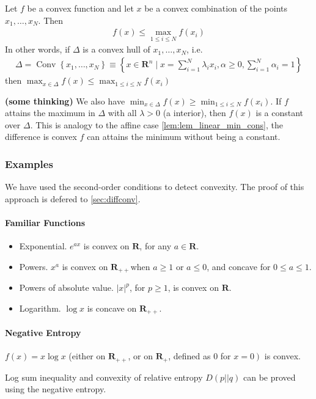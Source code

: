 \documentclass{article}
\newcommand{\bfs}[1]{\textbf{({#1}) }}
\begin{document}
\begin{cora}\label{co:b_f_ex}
Let $f$ be a convex function and let $x$ be a convex combination of the points $x_{1}, \ldots, x_{N} .$ Then
\begin{align*}
f(x) \leq \max _{1 \leq i \leq N} f\left(x_{i}\right)
\end{align*}
In other words, if $\Delta$ is a convex hull of $x_{1}, \ldots, x_{N}$, i.e.
\begin{align*}
\Delta=\operatorname{Conv}\left\{x_{1}, \ldots, x_{N}\right\} \equiv\left\{x \in \mathbf{R}^{n} \mid x=\sum_{i=1}^{N} \lambda_{i} x_{i}, \alpha \geq 0, \sum_{i=1}^{N} \alpha_{i}=1\right\}
\end{align*}
then $\max _{x \in \Delta} f(x) \leq \max _{1 \leq i \leq N} f\left(x_{i}\right)$
\end{cora}
\begin{rema}{\bfs{some thinking}}\label{rem:max_conffff}
We also have $\min _{x \in \Delta} f(x) \ge \min _{1 \leq i \leq N} f\left(x_{i}\right)$. If $f$ attains the maximum in $ \Delta$ with all $\lambda>0$ (a interior), then $f(x)$ is a constant over $\Delta$. This is analogy to the affine case  \cref{lem:lem_linear_min_cons}, the difference is convex $f$ can attains the minimum without being a constant.
\end{rema}

\subsubsection{Examples}\label{sec:conxff}
We have used the second-order conditions to detect convexity. The proof of this approach is defered to \cref{sec:diffconv}.
\paragraph{Familiar Functions}
\begin{itemize}
    \item Exponential. $e^{a x}$ is convex on $\mathbf{R}$, for any $a \in \mathbf{R}$.
    \item  Powers. $x^{a}$ is convex on $\mathbf{R}_{++}$when $a \geq 1$ or $a \leq 0$, and concave for $0 \leq a \leq 1$.
    \item Powers of absolute value. $|x|^{p}$, for $p \geq 1$, is convex on $\mathbf{R}$.
    \item Logarithm. $\log x$ is concave on $\mathbf{R}_{++}$.
\end{itemize}
\paragraph{Negative Entropy}
$f(x)=x \log x$ (either on $\mathbf{R}_{++}$, or on $\mathbf{R}_{+}$, defined as 0 for $\left.x=0\right)$ is convex.
\begin{rema}
Log sum inequality and convexity of relative entropy $D(p || q)$ can be proved using the negative entropy.
\end{rema}
\end{document}
